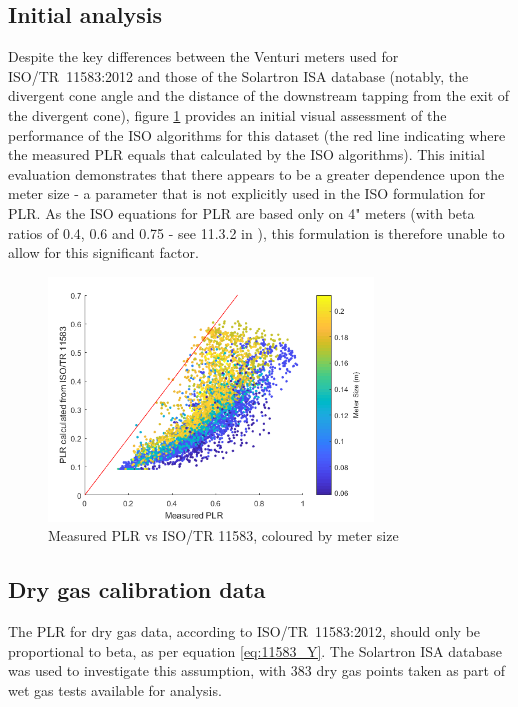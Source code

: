 \documentclass[journal]{IEEEtran}
\begin{document}
\subsection{Initial analysis} \label{ssect:Initial}
Despite the key differences between the Venturi meters used for ISO/TR~11583:2012 and those of the Solartron ISA database (notably, the divergent cone angle and the distance of the downstream tapping from the exit of the divergent cone), figure \ref{fig:PLR2} provides an initial visual assessment of the performance of the ISO algorithms for this dataset (the red line indicating where the measured PLR equals that calculated by the ISO algorithms). This initial evaluation demonstrates that there appears to be a greater dependence upon the meter size - a parameter that is not explicitly used in the ISO formulation for \acrshort{PLR}. As the ISO equations for PLR are based only on 4" meters (with beta ratios of 0.4, 0.6 and 0.75 - see 11.3.2 in \cite{Reader-Harris2015}), this formulation is therefore unable to allow for this significant factor.
\begin{figure}[h]
\centering
\includegraphics[width=3.4in]{PLR2.png}
\caption[]{ Measured PLR vs ISO/TR 11583, coloured by meter size }
\label{fig:PLR2}
\end{figure}




\subsection{Dry gas calibration data} 
The \acrshort{PLR} for dry gas data, according to ISO/TR~11583:2012, should only be proportional to beta, as per equation \ref{eq:11583_Y}.  The Solartron ISA database was used to investigate this assumption, with 383 dry gas points taken as part of wet gas tests available for analysis.  
\end{document}
